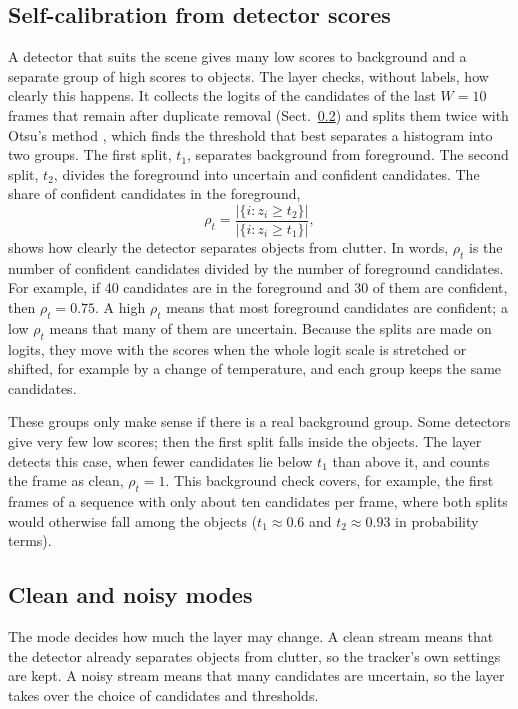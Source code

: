 \subsection{Self-calibration from detector scores}\label{sec:calib}
A detector that suits the scene gives many low scores to background and a
separate group of high scores to objects. The layer checks, without labels,
how clearly this happens. It collects the logits of the candidates of the
last $W=10$ frames that remain after duplicate removal
(Sect.~\ref{sec:regimes}) and splits them twice with Otsu's method \cite{otsu1979},
which finds the threshold that best separates a histogram into two groups.
The first split, $t_1$, separates background from foreground. The second
split, $t_2$, divides the foreground into uncertain and confident candidates.
The share of confident candidates in the foreground,
\begin{equation}
\rho_t=\frac{\left|\{i: z_i\ge t_2\}\right|}{\left|\{i: z_i\ge t_1\}\right|},
\label{eq:rho}
\end{equation}
shows how clearly the detector separates objects from clutter. In words,
$\rho_t$ is the number of confident candidates divided by the number of
foreground candidates. For example, if 40 candidates are in the foreground
and 30 of them are confident, then $\rho_t=0.75$. A high $\rho_t$ means that most foreground candidates are confident; a low $\rho_t$
means that many of them are uncertain. Because the splits are made on
logits, they move with the scores when the whole logit scale is stretched or
shifted, for example by a change of temperature, and each group keeps the
same candidates.

These groups only make sense if there is a real background group. Some
detectors give very few low scores; then the first split falls inside the
objects. The layer detects this case, when fewer candidates lie below $t_1$
than above it, and counts the frame as clean, $\rho_t=1$. This background
check covers, for example, the first frames of a sequence with only about
ten candidates per frame, where both splits would otherwise fall among the
objects ($t_1\approx0.6$ and $t_2\approx0.93$ in probability terms).

\subsection{Clean and noisy modes}\label{sec:regimes}
The mode decides how much the layer may change. A clean stream means that
the detector already separates objects from clutter, so the tracker's own
settings are kept. A noisy stream means that many candidates are uncertain,
so the layer takes over the choice of candidates and thresholds.

